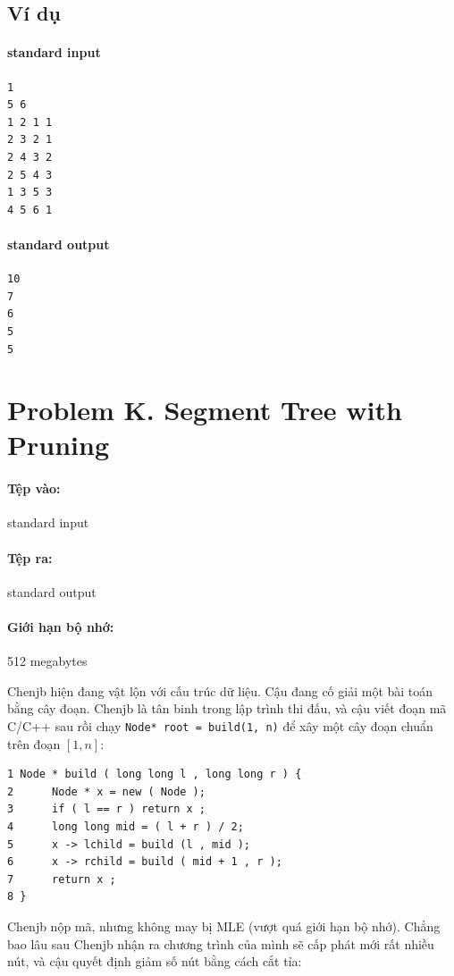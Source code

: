 \documentclass[11pt]{article}
\begin{document}
\subsection*{Ví dụ}

\paragraph{standard input}
\begin{verbatim}
1
5 6
1 2 1 1
2 3 2 1
2 4 3 2
2 5 4 3
1 3 5 3
4 5 6 1
\end{verbatim}

\paragraph{standard output}
\begin{verbatim}
10
7
6
5
5
\end{verbatim}

\section{Problem K. Segment Tree with Pruning}

\paragraph{Tệp vào:} standard input
\paragraph{Tệp ra:} standard output
\paragraph{Giới hạn bộ nhớ:} 512 megabytes

Chenjb hiện đang vật lộn với cấu trúc dữ liệu. Cậu đang cố giải một bài toán
bằng cây đoạn. Chenjb là tân binh trong lập trình thi đấu, và cậu viết đoạn
mã C/C++ sau rồi chạy \texttt{Node* root = build(1, n)} để xây một cây đoạn
chuẩn trên đoạn \([1,n]\):

\begin{verbatim}
1 Node * build ( long long l , long long r ) {
2      Node * x = new ( Node );
3      if ( l == r ) return x ;
4      long long mid = ( l + r ) / 2;
5      x -> lchild = build (l , mid );
6      x -> rchild = build ( mid + 1 , r );
7      return x ;
8 }
\end{verbatim}

Chenjb nộp mã, nhưng không may bị MLE (vượt quá giới hạn bộ nhớ). Chẳng bao
lâu sau Chenjb nhận ra chương trình của mình sẽ cấp phát mới rất nhiều nút,
và cậu quyết định giảm số nút bằng cách cắt tỉa:
\end{document}
